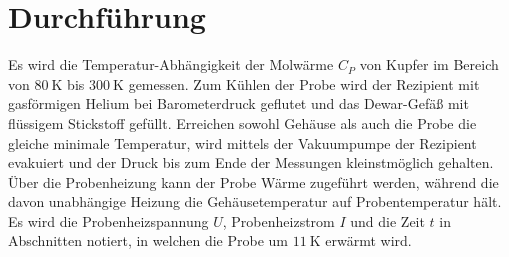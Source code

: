 \section{Durchführung}
Es wird die Temperatur-Abhängigkeit der Molwärme $C_P$ von Kupfer im
Bereich von $\SI{80}{\kelvin}$ bis $\SI{300}{\kelvin}$ gemessen. 
Zum Kühlen der Probe wird der Rezipient mit gasförmigen Helium bei Barometerdruck geflutet 
und das Dewar-Gefäß mit flüssigem Stickstoff gefüllt.
Erreichen sowohl Gehäuse als auch die Probe die gleiche minimale Temperatur, 
wird mittels der Vakuumpumpe der Rezipient evakuiert und der Druck bis zum Ende der Messungen kleinstmöglich gehalten.
Über die Probenheizung kann der Probe Wärme zugeführt werden, 
während die davon unabhängige Heizung die Gehäusetemperatur auf Probentemperatur hält.
Es wird die Probenheizspannung $U$, Probenheizstrom $I$ und die Zeit $t$ in Abschnitten notiert, 
in welchen die Probe um $\SI{11}{\kelvin}$ erwärmt wird.